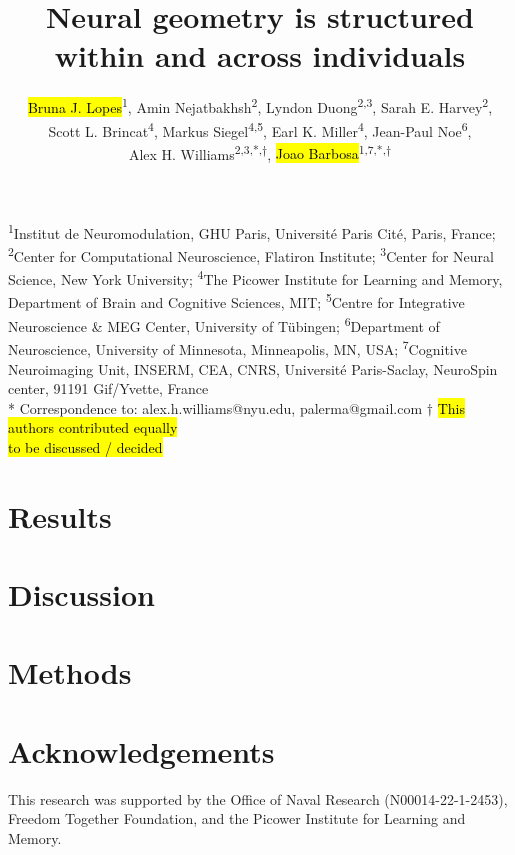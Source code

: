 \documentclass[11pt]{article}
\title{Neural geometry is structured within and across individuals}
\author{
     \hl{Bruna J. Lopes}\textsuperscript{1},
    Amin Nejatbakhsh\textsuperscript{2},
    Lyndon Duong\textsuperscript{2,3},
    Sarah E. Harvey\textsuperscript{2},\\
    Scott L. Brincat\textsuperscript{4},
    Markus Siegel\textsuperscript{4,5},
    Earl K. Miller\textsuperscript{4},
    Jean-Paul Noe\textsuperscript{6},\\
    Alex H. Williams\textsuperscript{2,3,*,$\dagger$},
    \hl{Joao Barbosa}\textsuperscript{1,7,*,$\dagger$}
}
\begin{document}
\date{}
\maketitle


\begin{center}
{\small
\textsuperscript{1}Institut de Neuromodulation, GHU Paris, Université Paris Cité, Paris, France;
\textsuperscript{2}Center for Computational Neuroscience, Flatiron Institute;
\textsuperscript{3}Center for Neural Science, New York University;
\textsuperscript{4}The Picower Institute for Learning and Memory, Department of Brain and Cognitive Sciences, MIT;
\textsuperscript{5}Centre for Integrative Neuroscience \& MEG Center, University of Tübingen;
\textsuperscript{6}Department of Neuroscience, University of Minnesota, Minneapolis, MN, USA;
\textsuperscript{7}Cognitive Neuroimaging Unit, INSERM, CEA, CNRS, Université Paris-Saclay, NeuroSpin center, 91191 Gif/Yvette, France\\[4pt]
* Correspondence to: alex.h.williams@nyu.edu, palerma@gmail.com
$\dagger$ \hl{This authors contributed equally}\\
\hl{to be discussed / decided }
}
\end{center}








\section{Results}






\section{Discussion}

\section{Methods}\label{sec:methods}


\section{Acknowledgements}
This research was supported by the Office of Naval Research (N00014-22-1-2453), Freedom Together Foundation, and the Picower Institute for Learning and Memory.


\clearpage
\begin{refcontext}[sorting=nyt]
\printbibliography
\end{refcontext}
\end{document}
